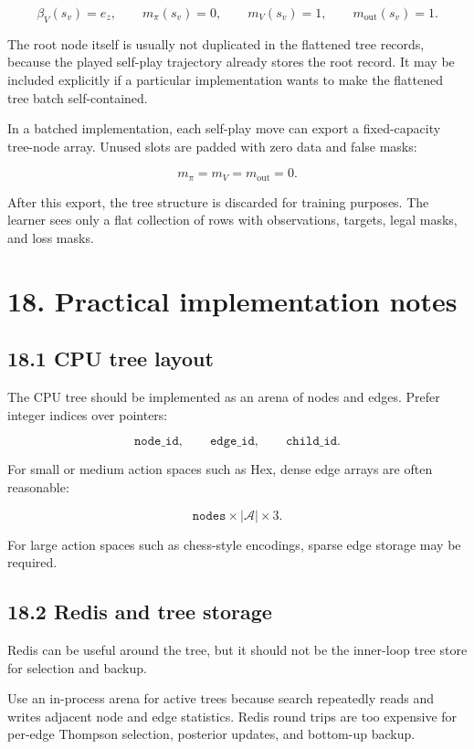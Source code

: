 \documentclass[11pt]{article}
\newcommand{\Actions}{\mathcal{A}}
\begin{document}
\[
\beta_V(s_v)=e_z,
\qquad
m_\pi(s_v)=0,
\qquad
m_V(s_v)=1,
\qquad
m_{\mathrm{out}}(s_v)=1.
\]

The root node itself is usually not duplicated in the flattened tree records,
because the played self-play trajectory already stores the root record. It may be
included explicitly if a particular implementation wants to make the flattened
tree batch self-contained.

In a batched implementation, each self-play move can export a fixed-capacity
tree-node array. Unused slots are padded with zero data and false masks:

\[
m_\pi=m_V=m_{\mathrm{out}}=0.
\]

After this export, the tree structure is discarded for training purposes. The
learner sees only a flat collection of rows with observations, targets, legal
masks, and loss masks.

\section*{18. Practical implementation notes}

\subsection*{18.1 CPU tree layout}

The CPU tree should be implemented as an arena of nodes and edges. Prefer
integer indices over pointers:

\[
\texttt{node\_id},
\qquad
\texttt{edge\_id},
\qquad
\texttt{child\_id}.
\]

For small or medium action spaces such as Hex, dense edge arrays are often
reasonable:

\[
\texttt{nodes} \times |\Actions| \times 3.
\]

For large action spaces such as chess-style encodings, sparse edge storage may
be required.

\subsection*{18.2 Redis and tree storage}

Redis can be useful around the tree, but it should not be the inner-loop tree
store for selection and backup.

Use an in-process arena for active trees because search repeatedly reads and
writes adjacent node and edge statistics. Redis round trips are too expensive
for per-edge Thompson selection, posterior updates, and bottom-up backup.
\end{document}
